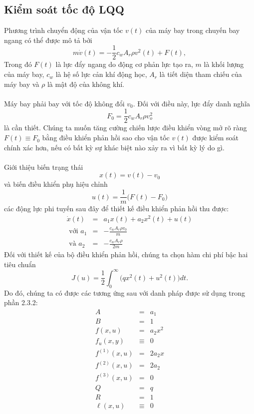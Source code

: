 \documentclass[12pt,a4paper]{report}
\begin{document}
\subsection{Kiểm soát tốc độ LQQ}
Phương trình chuyển động của vận tốc $v(t)$ của máy bay trong chuyến bay ngang có thể được mô tả bởi $$m\dot{v}(t) = -\frac{1}{2}c_wA_r\rho v^2(t) + F(t) ,$$ Trong đó $F(t)$ là lực đẩy ngang do động cơ phản lực tạo ra, $m$ là khối lượng của máy bay, $c_w$ là hệ số lực cản khí động học, $A_r$ là tiết diện tham chiếu của máy bay và $\rho$ là mật độ của không khí. \\\\Máy bay phải bay với tốc độ không đổi $v_0$. Đối với điều này, lực đẩy danh nghĩa $$F_0 = \frac{1}{2}c_wA_r\rho v_o^2$$ là cần thiết. Chúng ta muốn tăng cường chiến lược điều khiển vòng mở rõ ràng $F(t) \equiv F_0$ bằng điều khiển phản hồi sao cho vận tốc $v(t)$ được kiểm soát chính xác hơn, nếu có bất kỳ sự khác biệt nào xảy ra vì bất kỳ lý do gì. \\\\Giới thiệu biến trạng thái $$x(t) = v(t) - v_0$$ và biến điều khiển phụ hiệu chỉnh $$u(t) = \frac{1}{m}\big(F(t) - F_0\big)$$ các động lực phi tuyến sau đây để thiết kế điều khiển phản hồi thu được: \begin{eqnarray}
	\dot{x}(t) &=& a_1x(t) + a_2x^2(t) + u(t) \nonumber \\ \text{ với } a_1 &=& -\frac{c_wA_r\rho v_0}{m} \nonumber \\ \text{ và } a_2 &=& - \frac{c_wA_r\rho }{2m} \nonumber
\end{eqnarray} Đối với thiết kế của bộ điều khiển phản hồi, chúng ta chọn hàm chi phí bậc hai tiêu chuẩn $$J(u) = \frac{1}{2}\int_{0}^{\infty}\big(qx^2(t) + u^2(t)\big)dt.$$ Do đó, chúng ta có được các tương ứng sau với danh pháp được sử dụng trong phần 2.3.2: \begin{eqnarray}
	A&=&a_1\nonumber\\B&=&1\nonumber\\f(x, u) &=& a_2x^2 \nonumber \\ f_u(x, y) &\equiv& 0 \nonumber \\ f^{(1)}(x, u) &=& 2a_2x \nonumber \\ f^{(2)}(x, u) &=& 2a_2 \nonumber \\ f^{(3)}(x, u) &=& 0 \nonumber \\ Q&=&q \nonumber \\R&=&1 \nonumber \\\ell(x, u) &\equiv& 0 \nonumber 
\end{eqnarray}
\end{document}
